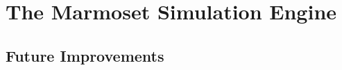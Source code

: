 \documentclass[ %
                    author={Alexander Hill},
                supervisor={Dr. Benjamin Sach},
                    degree={MEng},
                     title={MARMOSET},
                  subtitle={Multi-Agent Route Management using Online Simulation for Efficient Transportation},
                      type={research},
                      year={2016} ]{dissertation}
\begin{document}
\section{The Marmoset Simulation Engine}

\subsection{Future Improvements}





%
%
\end{document}
